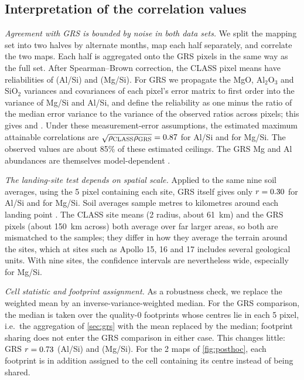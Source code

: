 \subsection{Interpretation of the correlation values}\label{sec:limits_scores}
\emph{Agreement with GRS is bounded by noise in both data sets.} We split the mapping set into two halves by alternate months, map each half separately, and correlate the two maps. Each half is aggregated onto the GRS pixels in the same way as the full set. After Spearman--Brown correction, the CLASS pixel means have reliabilities of \RelAl{} (Al/Si) and \RelMg{} (Mg/Si). For GRS we propagate the MgO, Al$_2$O$_3$ and SiO$_2$ variances and covariances of each pixel's error matrix to first order into the variance of Mg/Si and Al/Si, and define the reliability as one minus the ratio of the median error variance to the variance of the observed ratios across pixels; this gives \RelGrsAl{} and \RelGrsMg. Under these measurement-error assumptions, the estimated maximum attainable correlations are $\sqrt{\rho_\mathrm{CLASS}\rho_\mathrm{GRS}}=0.87$ for Al/Si and \CeilMg{} for Mg/Si. The observed values are about 85\% of these estimated ceilings. The GRS Mg and Al abundances are themselves model-dependent \citep{Prettyman2006}.

\emph{The landing-site test depends on spatial scale.} Applied to the same nine soil averages, using the 5\textdegree{} pixel containing each site, GRS itself gives only $r=0.30$ for Al/Si and \GrsSitesMg{} for Mg/Si. Soil averages sample metres to kilometres around each landing point \citep{Basu1998}. The CLASS site means (2\textdegree{} radius, about \SI{61}{km}) and the GRS pixels (about \SI{150}{km} across) both average over far larger areas, so both are mismatched to the samples; they differ in how they average the terrain around the sites, which at sites such as Apollo 15, 16 and 17 includes several geological units. With nine sites, the confidence intervals are nevertheless wide, especially for Mg/Si.

\emph{Cell statistic and footprint assignment.} As a robustness check, we replace the weighted mean by an inverse-variance-weighted median. For the GRS comparison, the median is taken over the quality-0 footprints whose centres lie in each 5\textdegree{} pixel, i.e.\ the aggregation of \cref{sec:grs} with the mean replaced by the median; footprint sharing does not enter the GRS comparison in either case. This changes little: GRS $r=0.73$ (Al/Si) and \MedGrsMg{} (Mg/Si). For the 2\textdegree{} maps of \cref{fig:posthoc}, each footprint is in addition assigned to the cell containing its centre instead of being shared.

